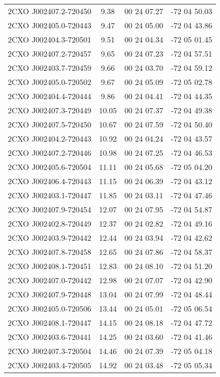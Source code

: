 \begin{table}
\begin{tabular}{cccc}
2CXO J002407.2-720450 & 9.38 & 00 24 07.27 & -72 04 50.03 \\
2CXO J002405.0-720443 & 9.47 & 00 24 05.00 & -72 04 43.86 \\
2CXO J002404.3-720501 & 9.51 & 00 24 04.34 & -72 05 01.45 \\
2CXO J002407.2-720457 & 9.65 & 00 24 07.23 & -72 04 57.51 \\
2CXO J002403.7-720459 & 9.66 & 00 24 03.70 & -72 04 59.12 \\
2CXO J002405.0-720502 & 9.67 & 00 24 05.09 & -72 05 02.78 \\
2CXO J002404.4-720444 & 9.86 & 00 24 04.41 & -72 04 44.35 \\
2CXO J002407.3-720449 & 10.05 & 00 24 07.37 & -72 04 49.38 \\
2CXO J002407.5-720450 & 10.67 & 00 24 07.59 & -72 04 50.40 \\
2CXO J002404.2-720443 & 10.92 & 00 24 04.24 & -72 04 43.57 \\
2CXO J002407.2-720446 & 10.98 & 00 24 07.25 & -72 04 46.53 \\
2CXO J002405.6-720504 & 11.11 & 00 24 05.68 & -72 05 04.20 \\
2CXO J002406.4-720443 & 11.15 & 00 24 06.39 & -72 04 43.12 \\
2CXO J002403.1-720447 & 11.85 & 00 24 03.11 & -72 04 47.46 \\
2CXO J002407.9-720454 & 12.07 & 00 24 07.95 & -72 04 54.87 \\
2CXO J002402.8-720449 & 12.37 & 00 24 02.82 & -72 04 49.16 \\
2CXO J002403.9-720442 & 12.44 & 00 24 03.94 & -72 04 42.62 \\
2CXO J002407.8-720458 & 12.65 & 00 24 07.86 & -72 04 58.37 \\
2CXO J002408.1-720451 & 12.83 & 00 24 08.10 & -72 04 51.20 \\
2CXO J002407.0-720442 & 12.98 & 00 24 07.07 & -72 04 42.90 \\
2CXO J002407.9-720448 & 13.04 & 00 24 07.99 & -72 04 48.44 \\
2CXO J002405.0-720506 & 13.44 & 00 24 05.01 & -72 05 06.54 \\
2CXO J002408.1-720447 & 14.15 & 00 24 08.18 & -72 04 47.72 \\
2CXO J002403.6-720441 & 14.25 & 00 24 03.60 & -72 04 41.46 \\
2CXO J002407.3-720504 & 14.46 & 00 24 07.39 & -72 05 04.18 \\
2CXO J002403.4-720505 & 14.92 & 00 24 03.48 & -72 05 05.34 \\

\end{tabular}
\end{table}
